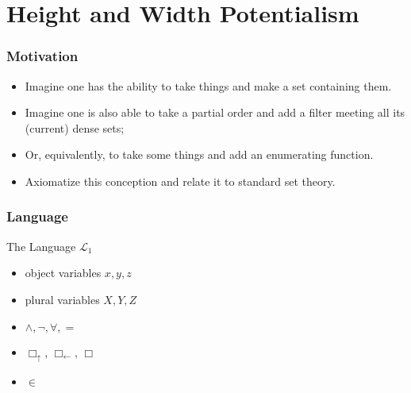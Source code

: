 \documentclass{beamer}
\newcommand{\bu}{\Box_\uparrow}
\newcommand{\bl}{\Box_\leftarrow}
\begin{document}
\section{Height and Width Potentialism}
\begin{frame}
    \frametitle{Motivation}
    \begin{itemize}
        \item<2->   Imagine one has the ability to take things and 
                    make a set containing them.
        \item<3->   Imagine one is also able to take a partial order and add a filter 
                    meeting all its (current) dense sets; 
        \item<4->   Or, equivalently, to take some things and add an enumerating function.
        \item<5->   Axiomatize this conception and relate it to standard set theory.
    \end{itemize}
\end{frame}
\begin{frame}
    \frametitle{Language}
    \begin{block}{The Language $\mathcal{L}_1$}
        \begin{itemize}
            \item object variables $x, y, z$
            \item<2-> plural variables $X, Y, Z$
            \item<3-> $\wedge, \neg, \forall, =$
            \item<4-> $\bu$, $\bl$, $\Box$
            \item<5-> $\in$
        \end{itemize} 
    \end{block}
\end{frame}
\end{document}
